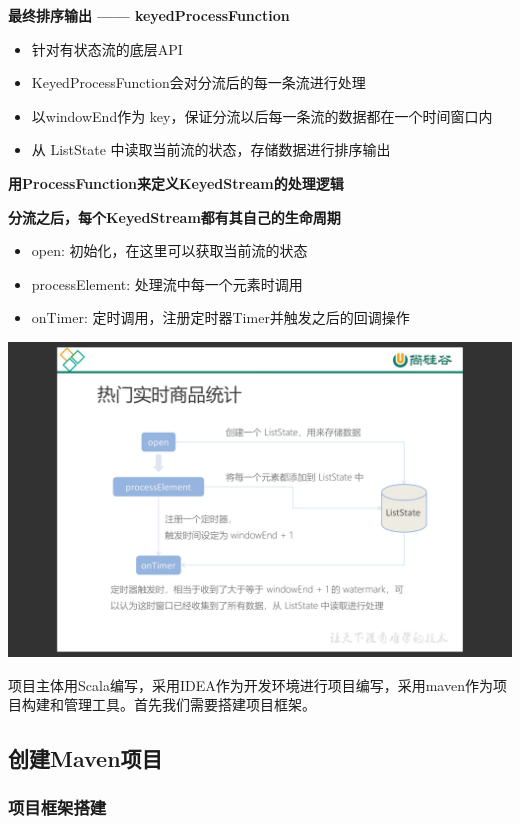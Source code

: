 \documentclass[oneside]{ctexbook}
\begin{document}
\textbf{最终排序输出 —— keyedProcessFunction}
\begin{itemize}
\item 针对有状态流的底层API
\item KeyedProcessFunction会对分流后的每一条流进行处理
\item 以windowEnd作为 key，保证分流以后每一条流的数据都在一个时间窗口内
\item 从 ListState 中读取当前流的状态，存储数据进行排序输出
\end{itemize}

\textbf{用ProcessFunction来定义KeyedStream的处理逻辑}

\textbf{分流之后，每个KeyedStream都有其自己的生命周期}
\begin{itemize}
\item open: 初始化，在这里可以获取当前流的状态
\item processElement: 处理流中每一个元素时调用
\item onTimer: 定时调用，注册定时器Timer并触发之后的回调操作
\end{itemize}

\noindent \includegraphics[width=\textwidth]{电商用户行为数据分析9.png}

项目主体用Scala编写，采用IDEA作为开发环境进行项目编写，采用maven作为项目构建和管理工具。首先我们需要搭建项目框架。

\subsection{创建Maven项目}

\subsubsection{项目框架搭建}
\end{document}
